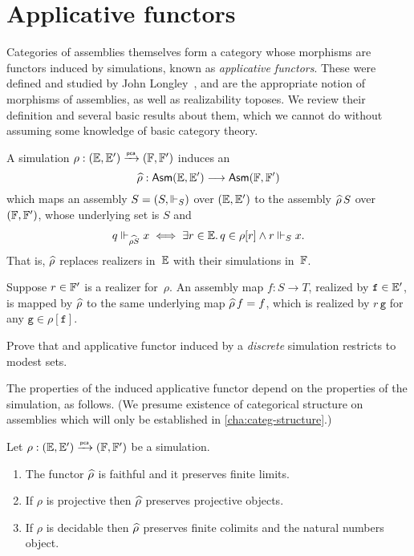 \section{Applicative functors}
\label{sec:applicative-functors}


%
%

Categories of assemblies themselves form a category whose morphisms are functors induced by simulations, known as \emph{applicative functors}. These were defined and studied by John Longley~\cite{Longley:94}, and are the appropriate notion of morphisms of assemblies, as well as realizability toposes. We review their definition and several basic results about them, which we cannot do without assuming some knowledge of basic category theory.

A simulation $\rho: (\EE, \subEE) \pcato (\FF, \subFF)$ induces an 
%
\begin{equation*}
  \ff{\rho}: \Asm{\EE, \subEE} \longrightarrow \Asm{\FF, \subFF}
\end{equation*}
%
which maps an assembly $S = (S, {\rz[S]})$ over $(\EE, \subEE)$ to the assembly
$\ff{\rho} \, S$ over $(\FF, \subFF)$, whose underlying set is $S$ and
%
\begin{align*}
  q \rz[\ff{\rho S}] x
  \iff \some{r \in \EE} q \in \rho[r] \land r \rz[S] x.
\end{align*}
%
That is, $\ff{\rho}$ replaces realizers in~$\EE$ with their simulations in~$\FF$.

Suppose $r \in \subFF$ is a realizer for~$\rho$. An assembly map $f: S \to T$, realized by $\mathtt{f} \in \subEE$, is mapped by $\ff{\rho}$ to the same underlying map $\ff{\rho}\,f = f$, which is realized by $r \, \mathtt{g}$ for any $\mathtt{g} \in \rho[\mathtt{f}]$.

\begin{exercise}
  Prove that and applicative functor induced by a \emph{discrete} simulation restricts to modest sets.
\end{exercise}

The properties of the induced applicative functor depend on the properties of the simulation, as follows. (We presume existence of categorical structure on assemblies which will only be established in \cref{cha:categ-structure}.)

\begin{proposition}
  \label{th:applicative_functor_properties}%
  Let $\rho: (\EE, \subEE) \pcato (\FF, \subFF)$ be a simulation.
  \begin{enumerate}
  \item
    The functor $\ff{\rho}$ is faithful  and it preserves finite limits.
  \item
    If $\rho$ is projective then $\ff{\rho}$ preserves projective objects.
  \item
    If $\rho$ is decidable then $\ff{\rho}$ preserves finite colimits and the natural numbers object.
  \end{enumerate}
\end{proposition}

